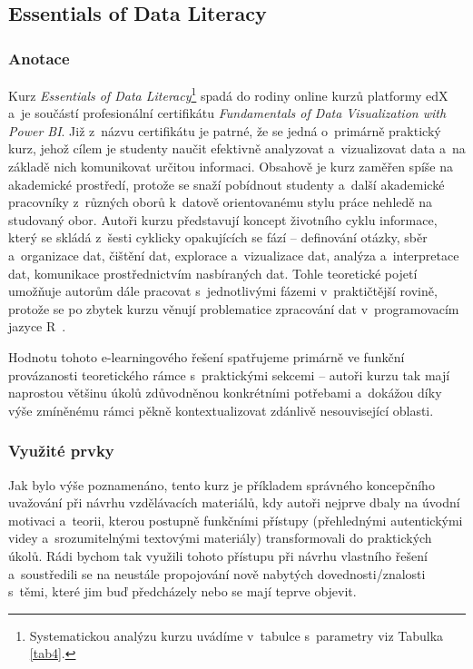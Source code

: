 \hypertarget{essentials-of-data-literacy}{%
\subsection{Essentials of Data Literacy}\label{essentials-of-data-literacy}}

\hypertarget{anotace-3}{%
\subsubsection{Anotace}\label{anotace-3}}

Kurz \emph{Essentials of Data Literacy}\footnote{Systematickou analýzu kurzu uvádíme v~tabulce s~parametry viz Tabulka \ref{tab4}.} spadá do rodiny online kurzů platformy edX a~je součástí profesionální certifikátu \emph{Fundamentals of Data Visualization with Power BI}. Již z~názvu certifikátu je patrné, že se jedná o~primárně praktický kurz, jehož cílem je studenty naučit efektivně analyzovat a~vizualizovat data a~na základě nich komunikovat určitou informaci. Obsahově je kurz zaměřen spíše na akademické prostředí, protože se snaží pobídnout studenty a~další akademické pracovníky z~různých oborů k~datově orientovanému stylu práce nehledě na studovaný obor. Autoři kurzu představují koncept životního cyklu informace, který se skládá z~šesti cyklicky opakujících se fází -- definování otázky, sběr a~organizace dat, čištění dat, explorace a~vizualizace dat, analýza a~interpretace dat, komunikace prostřednictvím nasbíraných dat. Tohle teoretické pojetí umožňuje autorům dále pracovat s~jednotlivými fázemi v~praktičtější rovině, protože se po zbytek kurzu věnují problematice zpracování dat v~programovacím jazyce R~\parencite{course4}.

Hodnotu tohoto e-learningového řešení spatřujeme primárně ve funkční provázanosti teoretického rámce s~praktickými sekcemi -- autoři kurzu tak mají naprostou většinu úkolů zdůvodněnou konkrétními potřebami a~dokážou díky výše zmíněnému rámci pěkně kontextualizovat zdánlivě nesouvisející oblasti.

\hypertarget{vyuux17eituxe9-prvky-3}{%
\subsubsection{Využité prvky}\label{vyuux17eituxe9-prvky-3}}

Jak bylo výše poznamenáno, tento kurz je příkladem správného koncepčního uvažování při návrhu vzdělávacích materiálů, kdy autoři nejprve dbaly na úvodní motivaci a~teorii, kterou postupně funkčními přístupy (přehlednými autentickými videy a~srozumitelnými textovými materiály) transformovali do praktických úkolů. Rádi bychom tak využili tohoto přístupu při návrhu vlastního řešení a~soustředili se na neustále propojování nově nabytých dovednosti/znalosti s~těmi, které jim buď předcházely nebo se mají teprve objevit.

